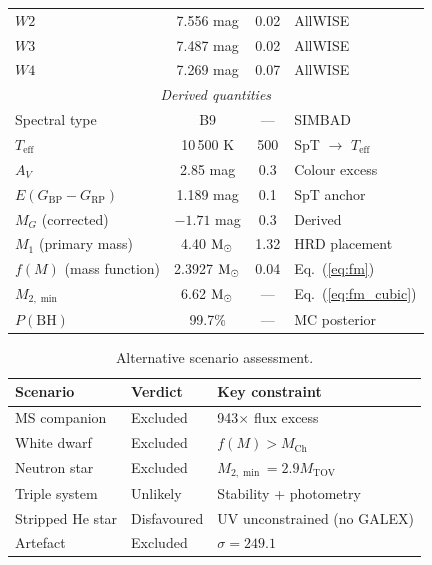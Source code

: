 \documentclass[usenatbib,fleqn]{mnras}
\newcommand{\Msun}{{\rm M}_\odot}
\newcommand{\fmass}{f(M)}
\begin{document}
\begin{table}
\begin{tabular}{lccl}
$W2$  & 7.556 mag & 0.02 & AllWISE \\
$W3$  & 7.487 mag & 0.02 & AllWISE \\
$W4$  & 7.269 mag & 0.07 & AllWISE \\
\midrule
\multicolumn{4}{c}{\textit{Derived quantities}} \\
Spectral type          & B9                  & ---      & SIMBAD \\
$T_\mathrm{eff}$       & 10\,500 K           & 500      & SpT $\to$ $T_\mathrm{eff}$ \\
$A_V$                  & 2.85 mag            & 0.3      & Colour excess \\
$E(G_\mathrm{BP} - G_\mathrm{RP})$ & 1.189 mag & 0.1 & SpT anchor \\
$M_G$ (corrected)      & $-1.71$ mag         & 0.3      & Derived \\
$M_1$ (primary mass)   & 4.40 $\Msun$        & 1.32     & HRD placement \\
$\fmass$ (mass function)  & 2.3927 $\Msun$      & 0.04     & Eq.~(\ref{eq:fm}) \\
$M_{2,\min}$           & 6.62 $\Msun$        & ---      & Eq.~(\ref{eq:fm_cubic}) \\
$P(\text{BH})$         & 99.7\%              & ---      & MC posterior \\
\bottomrule
\end{tabular}
\end{table}

\begin{table}
\centering
\caption{Alternative scenario assessment.}
\label{tab:scenarios}
\begin{tabular}{lll}
\toprule
Scenario & Verdict & Key constraint \\
\midrule
MS companion     & Excluded     & 943$\times$ flux excess \\
White dwarf      & Excluded     & $\fmass > M_\mathrm{Ch}$ \\
Neutron star     & Excluded     & $M_{2,\min} = 2.9 M_\mathrm{TOV}$ \\
Triple system    & Unlikely     & Stability + photometry \\
Stripped He star & Disfavoured  & UV unconstrained (no GALEX) \\
Artefact         & Excluded     & $\sigma = 249.1$ \\
\bottomrule
\end{tabular}
\end{table}
\end{document}

